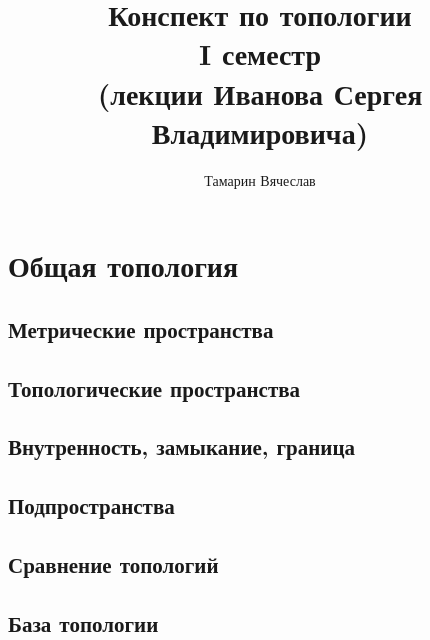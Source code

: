 \documentclass[11pt]{book}
\title{Конспект по топологии \\
I семестр \\
(лекции Иванова Сергея Владимировича)}
\author{Тамарин Вячеслав}
\theoremstyle{definition}
\theoremstyle{plain}
\theoremstyle{plain}
\theoremstyle{definition}
\theoremstyle{remark}
\begin{document}
\maketitle
\clearpage
\tableofcontents
\clearpage

\chapter{Общая топология}
\section{Метрические пространства}
\section{Топологические пространства}
\section{Внутренность, замыкание, граница}
\section{Подпространства}
\section{Сравнение топологий}
\section{База топологии}
\end{document}
